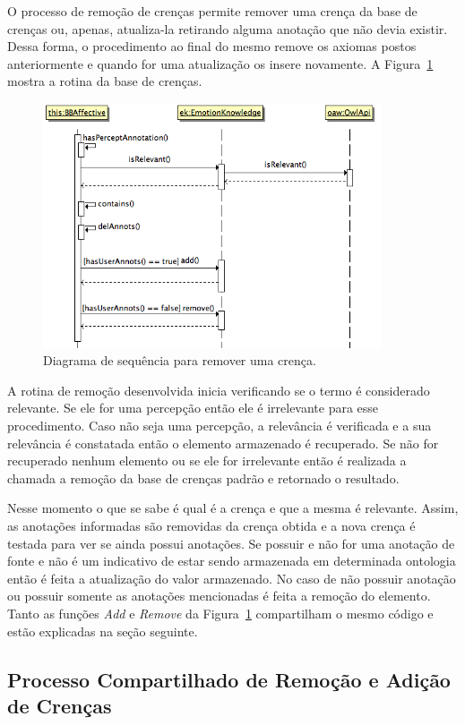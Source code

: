 O processo de remoção de crenças permite remover uma crença da base de crenças
ou, apenas, atualiza-la retirando alguma anotação que não devia existir. Dessa
forma, o procedimento ao final do mesmo remove os axiomas postos anteriormente
e quando for uma atualização os insere novamente. A Figura~\ref{fig:delBelief}
mostra a rotina da base de crenças.

\begin{figure}
  \centering
  \includegraphics[width=10cm]{figuras/delB.png}
  \caption{Diagrama de sequência para remover uma crença.}
  \label{fig:delBelief}
\end{figure}

A rotina de remoção desenvolvida inicia verificando se o termo é
considerado relevante. Se ele for uma percepção então ele é irrelevante para
esse procedimento. Caso não seja uma percepção, a relevância é verificada e
a sua relevância é constatada então o elemento armazenado é recuperado. Se não for
recuperado nenhum elemento ou se ele for irrelevante então é realizada a
chamada a remoção da base de crenças padrão e retornado o resultado.

Nesse momento o que se sabe é qual é a crença e que a mesma é relevante.
Assim, as anotações informadas são removidas da crença obtida e a nova
crença é testada para ver se ainda possui anotações. Se possuir e não for uma
anotação de fonte e não é um indicativo de estar sendo armazenada em
determinada ontologia então é feita a atualização do valor armazenado. No caso
de não possuir anotação ou possuir somente as anotações mencionadas é feita a
remoção do elemento. Tanto as funções \emph{Add} e \emph{Remove} da
Figura~\ref{fig:delBelief} compartilham o mesmo código e estão explicadas na
seção seguinte.

\subsection{Processo Compartilhado de Remoção e Adição de Crenças}

